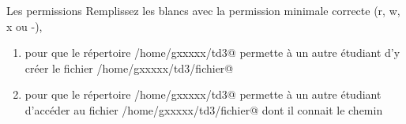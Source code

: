 \documentclass[a4paper,11pt]{article}
\begin{document}
		\begin{Exercice}{Les permissions} 
            		Remplissez les blancs avec la permission minimale correcte (r, w, x ou -),
			\begin{enumerate}
				\item pour que le r\'epertoire \verb@/home/gxxxxx/td3@ permette \`a un autre \'etudiant d'y cr\'eer le fichier  \verb@/home/gxxxxx/td3/fichier@\par
				 \textcolor{gray}{\underline{\hspace*{1em}}}  \textcolor{gray}{\underline{\hspace*{1em}}}  \textcolor{gray}{\underline{\hspace*{1em}}}  \textcolor{gray}	
				 {\underline{\hspace*{1em}}}  \textcolor{gray}{\underline{\hspace*{1em}}}  \textcolor{gray}{\underline{\hspace*{1em}}}  \textcolor{gray}
				 {\underline{\hspace*{1em}}}  \textcolor{gray}{\underline{\hspace*{1em}}}  \textcolor{gray}{\underline{\hspace*{1em}}} 
				 
				\item pour que le r\'epertoire \verb@/home/gxxxxx/td3@ permette \`a un autre \'etudiant d'acc\'eder au fichier \verb@/home/gxxxxx/td3/fichier@
					dont il connait le chemin
					\par
					 \textcolor{gray}{\underline{\hspace*{1em}}}  \textcolor{gray}{\underline{\hspace*{1em}}}  \textcolor{gray}{\underline{\hspace*{1em}}}  \textcolor{gray}
				 	{\underline{\hspace*{1em}}}  \textcolor{gray}{\underline{\hspace*{1em}}}  \textcolor{gray}{\underline{\hspace*{1em}}}  \textcolor{gray}
				 	{\underline{\hspace*{1em}}}  \textcolor{gray}{\underline{\hspace*{1em}}}  \textcolor{gray}{\underline{\hspace*{1em}}} 
			\end{enumerate}
				
		\end{Exercice}
		
\end{document}
